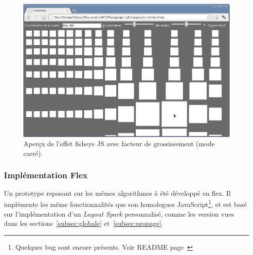 \begin{minipage}[H]{.5\textwidth}
\begin{figure}[H]
  \centering
  \includegraphics[width=\textwidth]{../resources/illustrations/js_screen_3}
  \caption{Aperçu de l'effet fisheye JS avec facteur de grossissement (mode carré).}
  \label{fig:js_6}
\end{figure}
\end{minipage}

\subsubsection{Implémentation Flex}

Un prototype reposant sur les mêmes algorithmes à été développé en flex. Il implémente les même fonctionnalités que son homologues JavaScript\footnote{Quelques bug sont encore présents. Voir README page~\pageref{sec:readme}}, et est basé sur l'implémentation d'un \emph{Layout Spark} personnalisé, comme les version vues dans les sections~\ref{subsec:globale} et~\ref{subsec:propage}.

